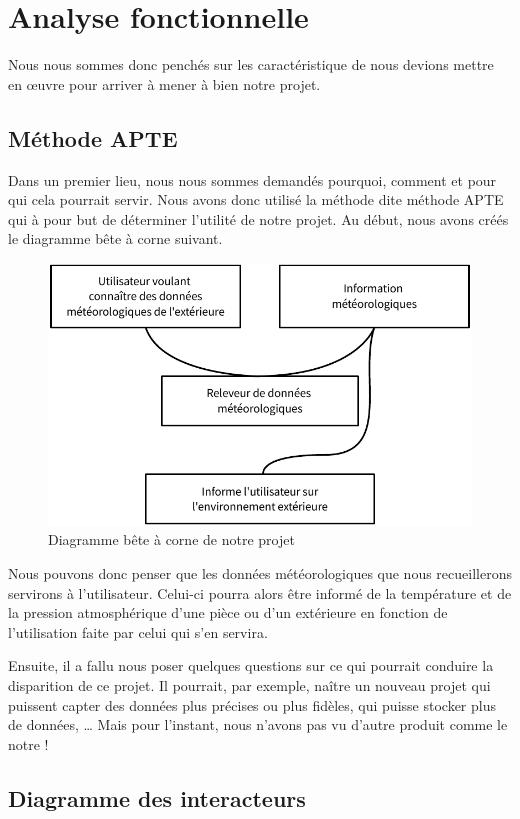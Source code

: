 \section{Analyse fonctionnelle}

Nous nous sommes donc penchés sur les caractéristique de nous devions mettre en œuvre pour arriver à mener à bien notre projet.

\subsection{Méthode APTE}

Dans un premier lieu, nous nous sommes demandés pourquoi, comment et pour qui cela pourrait servir. Nous avons donc utilisé la méthode dite \og méthode APTE \fg qui à pour but de déterminer l'utilité de notre projet. Au début, nous avons créés le diagramme bête à corne suivant.

\begin{figure}[!h]
	\centering
	\includegraphics[width=.6\linewidth]{Images/Diagramme_APTE}
	\caption{Diagramme bête à corne de notre projet}
\end{figure}

Nous pouvons donc penser que les données météorologiques que nous recueillerons servirons à l'utilisateur. Celui-ci pourra alors être informé de la température et de la pression atmosphérique d'une pièce ou d'un extérieure en fonction de l'utilisation faite par celui qui s'en servira.

Ensuite, il a fallu nous poser quelques questions sur ce qui pourrait conduire la disparition de ce projet. Il pourrait, par exemple, naître un nouveau projet qui puissent capter des données plus précises ou plus fidèles, qui puisse stocker plus de données, \dots{} Mais pour l'instant, nous n'avons pas vu d'autre produit comme le notre !

\subsection{Diagramme des interacteurs}

